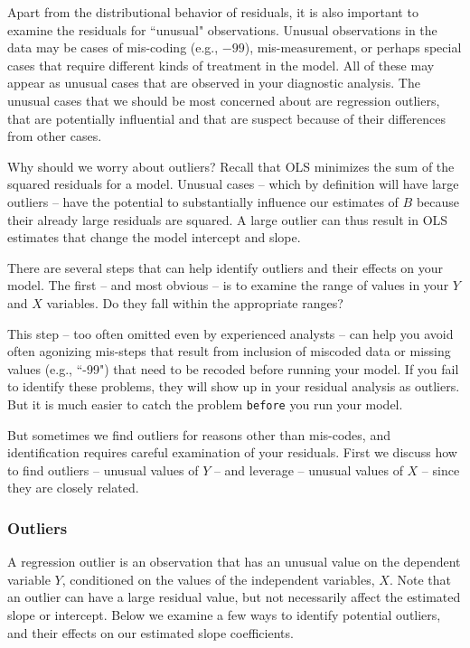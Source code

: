 \documentclass[11pt,openany]{book}\usepackage[]{graphicx}\usepackage[]{color}
\begin{document}
{Apart from the distributional behavior of residuals, it is also important to examine the residuals for ``unusual" observations. Unusual observations in the data may be cases of mis-coding (e.g., $-99$), mis-measurement, or perhaps special cases that require different kinds of treatment in the model. All of these may appear as unusual cases that are observed in your diagnostic analysis. The unusual cases that we should be most concerned about are regression outliers, that are potentially influential and that are suspect because of their differences from other cases.

Why should we worry about outliers? Recall that OLS minimizes the sum of the squared residuals for a model. Unusual cases -- which by definition will have large outliers -- have the potential to substantially influence our estimates of $B$ because their already large residuals are squared. A large outlier can thus result in OLS estimates that change the model intercept and slope.

There are several steps that can help identify outliers and their effects on your model. The first -- and most obvious -- is to examine the range of values in your $Y$ and $X$ variables. Do they fall within the appropriate ranges?

This step -- too often omitted even by experienced analysts -- can help you avoid often agonizing mis-steps that result from inclusion of miscoded data or missing values (e.g., ``-99") that need to be recoded before running your model. If you fail to identify these problems, they will show up in your residual analysis as outliers. But it is much easier to catch the problem \texttt{before} you run your model.

But sometimes we find outliers for reasons other than mis-codes, and identification requires careful examination of your residuals.  First we discuss how to find outliers -- unusual values of $Y$ -- and leverage -- unusual values of $X$ -- since they are closely related.  

\subsubsection{Outliers}

A regression outlier is an observation that has an unusual value on the dependent variable $Y$, conditioned on the values of the independent variables, $X$. Note that an outlier can have a large residual value, but not necessarily affect the estimated slope or intercept. Below we examine a few ways to identify potential outliers, and their effects on our estimated slope coefficients.   

}
\end{document}

